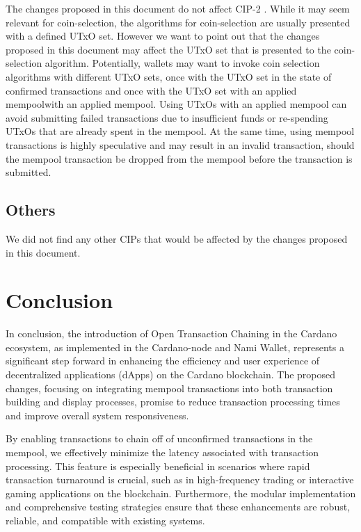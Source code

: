 \documentclass[11pt]{article}
\begin{document}
The changes proposed in this document do not affect CIP-2 \cite{cip2}.
While it may seem relevant for coin-selection, the algorithms for coin-selection are 
usually presented with a defined UTxO set.
However we want to point out that the changes proposed in this document may affect the UTxO set that is presented to the coin-selection algorithm.
Potentially, wallets may want to invoke coin selection algorithms with different UTxO sets,
once with the UTxO set in the state of confirmed transactions and once with the UTxO set with an applied mempoolwith an applied mempool.
Using UTxOs with an applied mempool can avoid submitting failed transactions due to insufficient funds
or re-spending UTxOs that are already spent in the mempool.
At the same time, using mempool transactions is highly speculative and may result in an invalid transaction,
should the mempool transaction be dropped from the mempool before the transaction is submitted.

\subsection{Others}

We did not find any other CIPs that would be affected by the changes proposed in this document.

\section{Conclusion}

In conclusion, the introduction of Open Transaction Chaining in the Cardano ecosystem, as implemented in the Cardano-node and Nami Wallet, represents a significant step forward in enhancing the efficiency and user experience of decentralized applications (dApps) on the Cardano blockchain. The proposed changes, focusing on integrating mempool transactions into both transaction building and display processes, promise to reduce transaction processing times and improve overall system responsiveness.

By enabling transactions to chain off of unconfirmed transactions in the mempool, we effectively minimize the latency associated with transaction processing. This feature is especially beneficial in scenarios where rapid transaction turnaround is crucial, such as in high-frequency trading or interactive gaming applications on the blockchain. Furthermore, the modular implementation and comprehensive testing strategies ensure that these enhancements are robust, reliable, and compatible with existing systems.
\end{document}
